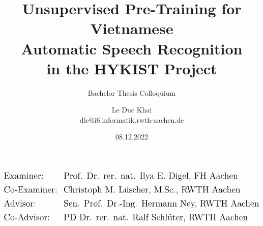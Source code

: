 \documentclass[t]{beamer}
\title{
Unsupervised Pre-Training for Vietnamese \\ Automatic Speech Recognition \\ in the HYKIST Project
}
\subtitle{
Bachelor Thesis Colloquium
}
\date[RWTH]{08.12.2022}
\author[Khai]{Le Duc Khai \\
dle@i6.informatik.rwth-aachen.de}
\institute[]{RWTH Aachen University}
\begin{document}




\begin{frame}[plain]
\titlepage

\begin{align*}
&\Large\text{Examiner:}  &&\Large\text{Prof. Dr. rer. nat. Ilya E. Digel, FH Aachen}\\
&\Large\text{Co-Examiner:}  &&\Large\text{Christoph M. Lüscher, M.Sc., RWTH Aachen}\\
&\Large\text{Advisor:}  &&\Large\text{Sen. Prof. Dr.-Ing. Hermann Ney, RWTH Aachen}\\
&\Large\text{Co-Advisor:}  &&\Large\text{PD Dr. rer. nat. Ralf Schlüter, RWTH Aachen}
\end{align*}

\end{frame}















\end{document}
